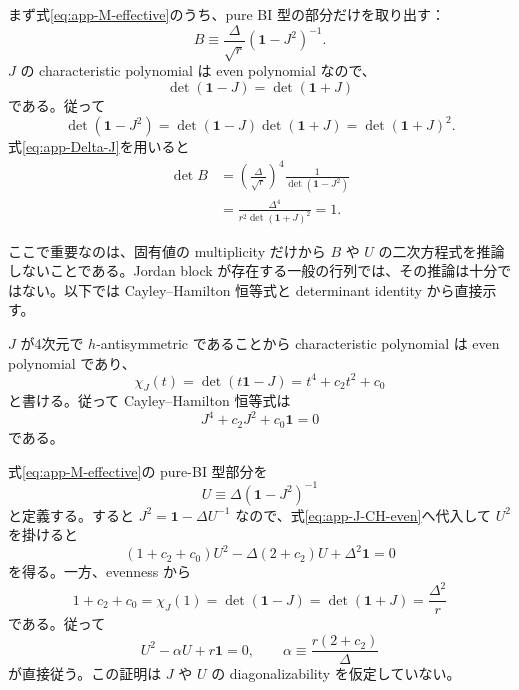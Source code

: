 \documentclass[a4paper,11pt]{ltjsreport}
\newcommand{\Id}{\mathbf 1}
\begin{document}
まず式\eqref{eq:app-M-effective}のうち、pure BI 型の部分だけを取り出す：
\begin{equation}
 B\equiv\frac{\Delta}{\sqrt r}(\Id-J^2)^{-1}.
 \label{eq:app-B}
\end{equation}
$J$ の characteristic polynomial は even polynomial なので、
\begin{equation}
 \det(\Id-J)=\det(\Id+J)
\end{equation}
である。従って
\begin{equation}
 \det(\Id-J^2)=\det(\Id-J)\det(\Id+J)
 =\det(\Id+J)^2.
\end{equation}
式\eqref{eq:app-Delta-J}を用いると
\begin{align}
 \det B
 &=\left(\frac{\Delta}{\sqrt r}\right)^4
   \frac{1}{\det(\Id-J^2)}\nonumber\\
 &=\frac{\Delta^4}{r^2\det(\Id+J)^2}=1.
 \label{eq:app-detB}
\end{align}

ここで重要なのは、固有値の multiplicity だけから $B$ や $U$ の二次方程式を推論しないことである。Jordan block が存在する一般の行列では、その推論は十分ではない。以下では Cayley--Hamilton 恒等式と determinant identity から直接示す。

$J$ が4次元で $h$-antisymmetric であることから characteristic polynomial は even polynomial であり、
\begin{equation}
 \chi_J(t)=\det(t\Id-J)=t^4+c_2t^2+c_0
 \label{eq:app-J-even-char}
\end{equation}
と書ける。従って Cayley--Hamilton 恒等式は
\begin{equation}
 J^4+c_2J^2+c_0\Id=0
 \label{eq:app-J-CH-even}
\end{equation}
である。

式\eqref{eq:app-M-effective}の pure-BI 型部分を
\begin{equation}
 U\equiv\Delta(\Id-J^2)^{-1}
 \label{eq:app-U-def-rigorous}
\end{equation}
と定義する。すると $J^2=\Id-\Delta U^{-1}$ なので、式\eqref{eq:app-J-CH-even}へ代入して $U^2$ を掛けると
\begin{equation}
 (1+c_2+c_0)U^2-\Delta(2+c_2)U+\Delta^2\Id=0
 \label{eq:app-U-prequadratic}
\end{equation}
を得る。一方、evenness から
\begin{equation}
 1+c_2+c_0
 =\chi_J(1)
 =\det(\Id-J)
 =\det(\Id+J)
 =\frac{\Delta^2}{r}
 \label{eq:app-char-one}
\end{equation}
である。従って
\begin{equation}
 U^2-\alpha U+r\Id=0,
 \qquad
 \alpha\equiv\frac{r(2+c_2)}{\Delta}
 \label{eq:app-U-quadratic}
\end{equation}
が直接従う。この証明は $J$ や $U$ の diagonalizability を仮定していない。
\end{document}
